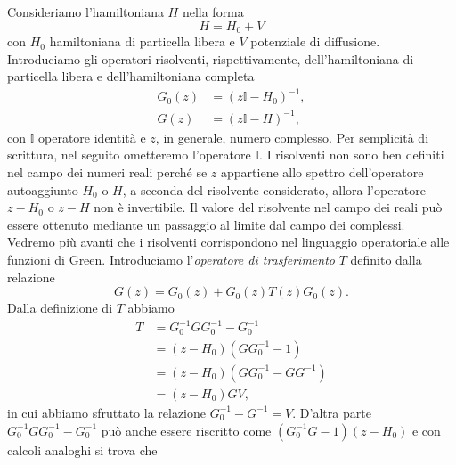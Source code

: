 \documentclass[a4paper,fleqn,twoside,12pt]{article}
\begin{document}
Consideriamo l'hamiltoniana $H$ nella forma
\begin{equation}
  H = H_{0} + V
\end{equation}
con $H_{0}$ hamiltoniana di particella libera e $V$ potenziale di diffusione.
Introduciamo gli operatori risolventi, rispettivamente, dell'hamiltoniana di
particella libera e dell'hamiltoniana completa
\begin{subequations}
  \begin{align}
    G_{0}(z) &= (z\mathbb{I} - H_{0})^{-1}, \\
    G(z) &= (z\mathbb{I} - H)^{-1},
  \end{align}
\end{subequations}
con $\mathbb{I}$ operatore identità e $z$, in generale, numero complesso.  Per
semplicità di scrittura, nel seguito ometteremo l'operatore $\mathbb{I}$.  I
risolventi non sono ben definiti nel campo dei numeri reali perché se $z$
appartiene allo spettro dell'operatore autoaggiunto $H_{0}$ o $H$, a seconda del
risolvente considerato, allora l'operatore $z - H_{0}$ o $z - H$ non è
invertibile.  Il valore del risolvente nel campo dei reali può essere ottenuto
mediante un passaggio al limite dal campo dei complessi.  Vedremo più avanti che
i risolventi corrispondono nel linguaggio operatoriale alle funzioni di Green.
Introduciamo l'\emph{operatore di trasferimento} $T$ definito dalla relazione
\begin{equation}
  \label{eq:oper-trasferimento}
  G(z) = G_{0}(z) + G_{0}(z) T(z) G_{0}(z).
\end{equation}
Dalla definizione di $T$ abbiamo
\begin{equation}
  \begin{split}
    T &= G_{0}^{-1} G G_{0}^{-1} - G_{0}^{-1} \\
    &= (z - H_{0})(GG_{0}^{-1} - 1) \\
    &= (z - H_{0})(GG_{0}^{-1} - GG^{-1}) \\
    &= (z - H_{0})GV,
  \end{split}
\end{equation}
in cui abbiamo sfruttato la relazione $G_{0}^{-1} - G^{-1} = V$.  D'altra parte
$G_{0}^{-1} G G_{0}^{-1} - G_{0}^{-1}$ può anche essere riscritto come
$(G_{0}^{-1}G - 1)(z - H_{0})$ e con calcoli analoghi si trova che
\end{document}
